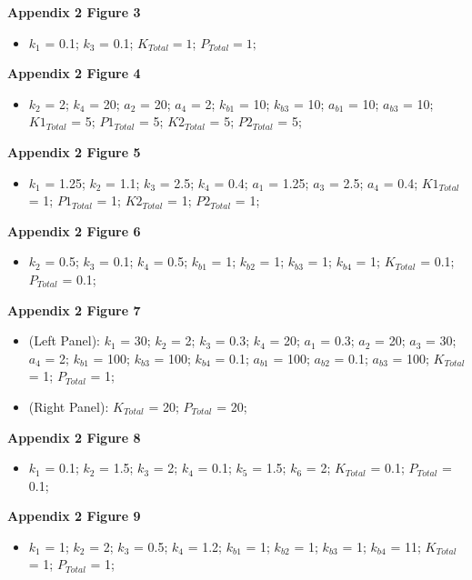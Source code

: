 \documentclass[9pt,lineno]{elife}
\begin{document}
\begin{appendixbox}
\textbf{Appendix 2 Figure 3}
\begin{itemize}
    \item $k_1$ = 0.1; $k_3$ = 0.1; $K_{Total} = 1$; $P_{Total} = 1;$
\end{itemize}

\textbf{Appendix 2 Figure 4}
\begin{itemize}
    \item $k_2$ = 2; $k_4$ = 20; $a_2$ = 20; $a_4$ = 2; $k_{b1}$ = 10; $k_{b3}$ = 10; $a_{b1}$ = 10; $a_{b3}$ = 10; $K1_{Total}$ = 5;  $P1_{Total}$ = 5; $K2_{Total}$ = 5;  $P2_{Total}$ = 5;
\end{itemize}

\textbf{Appendix 2 Figure 5}
\begin{itemize}
\item $k_1$ = 1.25; $k_2$ = 1.1; $k_3$ = 2.5; $k_4$ = 0.4; $a_1$ = 1.25; $a_3$ = 2.5; $a_4$ = 0.4; $K1_{Total}$ = 1; $P1_{Total}$ = 1; $K2_{Total}$ = 1; $P2_{Total}$  = 1;
\end{itemize}
    
\textbf{Appendix 2 Figure 6}
\begin{itemize}
    \item $k_2$ = 0.5; $k_3$ = 0.1; $k_4$ = 0.5; $k_{b1}$ = 1; $k_{b2}$ = 1; $k_{b3}$ = 1; $k_{b4}$ = 1; $K_{Total}$ = 0.1; $P_{Total}$ = 0.1; 
\end{itemize}
  
\textbf{Appendix 2 Figure 7}
\begin{itemize}
    \item (Left Panel): $k_1$ = 30; $k_2$ = 2; $k_3$ = 0.3; $k_4$ = 20; $a_1$ = 0.3; $a_2$ = 20; $a_3$ = 30; $a_4$ = 2; $k_{b1}$ = 100; $k_{b3}$ = 100; $k_{b4}$ = 0.1; $a_{b1}$ = 100; $a_{b2}$ = 0.1; $a_{b3}$ = 100; $K_{Total}$ = 1; $P_{Total}$ = 1; 
    \item (Right Panel): $K_{Total}$ = 20; $P_{Total}$ = 20; 
\end{itemize}

\textbf{Appendix 2 Figure 8}
\begin{itemize}
    \item $k_1$ = 0.1; $k_2$ = 1.5; $k_3$ = 2; $k_4$ = 0.1; $k_5$ = 1.5; $k_6$ = 2; $K_{Total}$ = 0.1;  $P_{Total}$ = 0.1;  
\end{itemize}

\textbf{Appendix 2 Figure 9}
\begin{itemize}
    \item $k_1$ = 1; $k_2$ = 2; $k_3$ = 0.5; $k_4$ = 1.2; $k_{b1}$ = 1; $k_{b2}$ = 1; $k_{b3}$ = 1; $k_{b4}$ = 11; $K_{Total}$ = 1; $P_{Total}$ = 1; 
\end{itemize}
\end{appendixbox}
\end{document}
